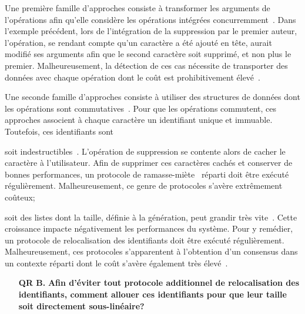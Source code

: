 \begin{itemize}
  Une première famille d'approches consiste à transformer les arguments de
  l'opérations afin qu'elle considère les opérations intégrées
  concurremment~\cite{sun1998operational}. Dans l'exemple précédent, lors de
  l'intégration de la suppression par le premier auteur, l'opération, se rendant
  compte qu'un caractère a été ajouté en tête, aurait modifié ses arguments afin
  que le second caractère soit supprimé, et non plus le
  premier. Malheureusement, la détection de ces cas nécessite de transporter des
  données avec chaque opération dont le coût est prohibitivement
  élevé~\cite{sun2009contextbased}.

  Une seconde famille d'approches consiste à utiliser des structures de données
  dont les opérations sont commutatives~\cite{shapiro2011conflict}. Pour que les
  opérations commutent, ces approches associent à chaque caractère un
  identifiant unique et immuable. Toutefois, ces identifiants sont
  \begin{inparaenum}[(i)]
  \item soit indestructibles~\cite{oster2006data}. L'opération de suppression se
    contente alors de cacher le caractère à l'utilisateur. Afin de supprimer ces
    caractères cachés et conserver de bonnes performances, un protocole de
    ramasse-miète~\cite{abdullahi1998garbage} réparti doit être exécuté
    régulièrement. Malheureusement, ce genre de protocoles s'avère extrêmement
    coûteux;
  \item soit des listes dont la taille, définie à la génération, peut grandir
    très vite~\cite{weiss2009logoot}. Cette croissance impacte négativement les
    performances du système. Pour y remédier, un protocole de relocalisation des
    identifiants doit être exécuté régulièrement. Malheureusement, ces
    protocoles s'apparentent à l'obtention d'un consensus dans un contexte
    réparti dont le coût s'avère également très
    élevé~\cite{mostefaoui2015signature}.
  \end{inparaenum}

  \begin{itemize}
  \item [\textbf{QR B.}] \textbf{Afin d'éviter tout protocole additionnel de
      relocalisation des identifiants, comment allouer ces identifiants pour que
      leur taille soit directement sous-linéaire?}
  \end{itemize}


\end{itemize}

